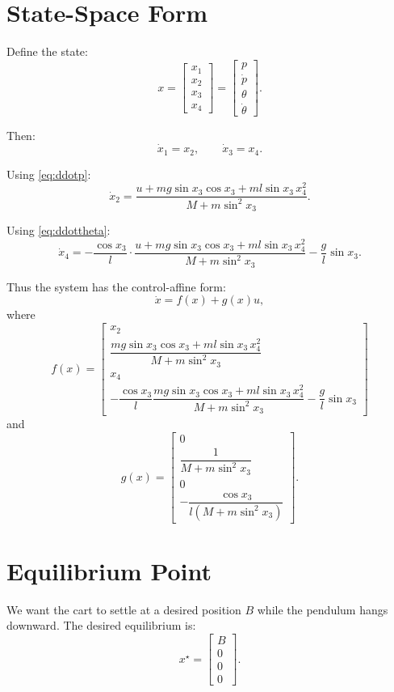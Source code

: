 \documentclass[11pt,a4paper]{article}
\begin{document}
\section{State-Space Form}

Define the state:
\[
x =
\begin{bmatrix}
x_1 \\ x_2 \\ x_3 \\ x_4
\end{bmatrix}
=
\begin{bmatrix}
p \\ \dot p \\ \theta \\ \dot\theta
\end{bmatrix}.
\]

Then:
\[
\dot x_1 = x_2,
\qquad
\dot x_3 = x_4.
\]

Using \eqref{eq:ddotp}:
\[
\dot x_2
=
\frac{
u + mg\sin x_3\cos x_3 + ml\sin x_3\,x_4^2
}{
M + m\sin^2 x_3
}.
\]

Using \eqref{eq:ddottheta}:
\[
\dot x_4
=
-\frac{\cos x_3}{l}
\cdot
\frac{
u + mg\sin x_3\cos x_3 + ml\sin x_3\,x_4^2
}{
M + m\sin^2 x_3
}
-\frac{g}{l}\sin x_3.
\]

Thus the system has the control-affine form:
\[
\dot x = f(x) + g(x)u,
\]
where
\[
f(x)=
\begin{bmatrix}
x_2 \\[1ex]
\dfrac{
mg\sin x_3\cos x_3 + ml\sin x_3\,x_4^2
}{
M + m\sin^2 x_3
} \\[3ex]
x_4 \\[1ex]
-\dfrac{\cos x_3}{l}
\dfrac{
mg\sin x_3\cos x_3 + ml\sin x_3\,x_4^2
}{
M + m\sin^2 x_3
}
-\dfrac{g}{l}\sin x_3
\end{bmatrix}
\]
and
\[
g(x)=
\begin{bmatrix}
0 \\[1ex]
\dfrac{1}{M + m\sin^2 x_3} \\[3ex]
0 \\[1ex]
-\dfrac{\cos x_3}{l\left(M + m\sin^2 x_3\right)}
\end{bmatrix}.
\]

\section{Equilibrium Point}

We want the cart to settle at a desired position \(B\) while the pendulum hangs downward. The desired equilibrium is:
\[
x^\star =
\begin{bmatrix}
B \\ 0 \\ 0 \\ 0
\end{bmatrix}.
\]
\end{document}
